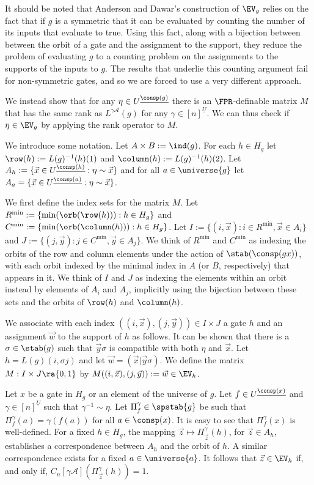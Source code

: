 \documentclass[a4paper,UKenglish]{lipics-v2018}
\begin{document}
It should be noted that Anderson and Dawar's construction of $\EV_g$ relies on
the fact that if $g$ is a symmetric that it can be evaluated by counting the
number of its inputs that evaluate to true. Using this fact, along with a
bijection between between the orbit of a gate and the assignment to the support,
they reduce the problem of evaluating $g$ to a counting problem on the
assignments to the supports of the inputs to $g$. The results that underlie this
counting argument fail for non-symmetric gates, and so we are forced to use a
very different approach.

We instead show that for any $\eta \in U^{\underline{\consp(g)}}$ there is an
$\FPR$-definable matrix $M$ that has the same rank as $L^{\gamma
  \mathcal{A}}(g)$ for any $\gamma \in [n]^{\underline{U}}$. We can thus check
if $\eta \in \EV_g$ by applying the rank operator to $M$.

We introduce some notation. Let $A \times B := \ind(g)$. For each $h \in H_g$
let $\row(h) := L(g)^{-1}(h)(1)$ and $\column(h) := L(g)^{-1}(h)(2)$. Let $A_h
:= \{ \vec{x} \in U^{\underline{\consp(h)}} : \eta \sim \vec{x} \}$ and for all
$a \in \universe{g}$ let $A_a = \{\vec{x} \in U^{\underline{\consp(a)}} : \eta
\sim \vec{x}\}$.

We first define the index sets for the matrix $M$. Let $R^{\min} := \{\min
(\orb(\row(h))) : h \in H_g\}$ and $C^{\min} := \{ \min (\orb (\column(h))) : h
\in H_g\}$. Let $I := \{(i, \vec{x}): i \in R^{\min}, \vec{x} \in A_i\}$ and $J
:= \{(j, \vec{y}): j \in C^{\min}, \vec{y} \in A_j\}$. We think of $R^{\min}$
and $C^{\min}$ as indexing the orbits of the row and column elements under the
action of $\stab(\consp(gx))$, with each orbit indexed by the minimal index in
$A$ (or $B$, respectively) that appears in it. We think of $I$ and $J$ as
indexing the elements within an orbit instead by elements of $A_i$ and $A_j$,
implicitly using the bijection between these sets and the orbits of $\row(h)$
and $\column(h)$.

We associate with each index $((i, \vec{x}), (j, \vec{y})) \in I \times J$ a
gate $h$ and an assignment $\vec{w}$ to the support of $h$ as follows. It can be
shown that there is a $\sigma \in \stab(g)$ such that $\vec{y} \sigma$ is
compatible with both $\eta$ and $\vec{x}$. Let $h = L(g)(i, \sigma j)$ and let
$\vec{w} = (\vec{x} \vert \vec{y} \sigma)$. We define the matrix $M : I \times J
\ra \{0,1\}$ by $M((i , \vec{x}), (j, \vec{y})) := \vec{w} \in \EV_h$.

Let $x$ be a gate in $H_g$ or an element of the universe of $g$. Let $f \in
U^{\underline{\consp(x)}}$ and $\gamma \in [n]^{\underline{U}}$ such that
$\gamma^{-1} \sim \eta$. Let $\Pi^{\gamma}_{f} \in \spstab{g}$ be such that
$\Pi^{\gamma}_f (a) = \gamma (f(a))$ for all $a \in \consp(x)$. It is easy to
see that $\Pi^{\gamma}_f(x)$ is well-defined. For a fixed $h \in H_g$, the
mapping $\vec{z} \mapsto \Pi^{\gamma}_{\vec{z}}(h)$, for $\vec{z} \in A_h$,
establishes a correspondence between $A_h$ and the orbit of $h$. A similar
correspondence exists for a fixed $a \in \universe{a}$. It follows that $\vec{z}
\in \EV_h$ if, and only if, $C_n[\gamma \mathcal{A}](\Pi^{\gamma}_{\vec{z}}(h))
= 1$. \cite{DW-arxiv}
\end{document}
